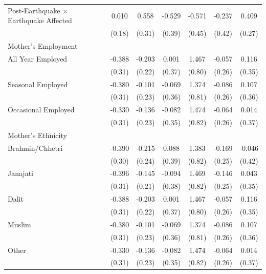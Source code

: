 \begin{longtable}{l*{6}{c}}
Post-Earthquake × Earthquake Affected & 0.010 & 0.558\sym{*} & -0.529 & -0.571 & -0.237 & 0.409 \\
                    & (0.18) & (0.31) & (0.39) & (0.45) & (0.42) & (0.27) \\
\multicolumn{7}{l}{Mother's Employment} \\
\hspace{1em}All Year Employed & -0.388 & -0.203 & 0.001 & 1.467\sym{*} & -0.057 & 0.116 \\
                    & (0.31) & (0.22) & (0.37) & (0.80) & (0.26) & (0.35) \\
\hspace{1em}Seasonal Employed & -0.380 & -0.101 & -0.069 & 1.374\sym{*} & -0.086 & 0.107 \\
                    & (0.31) & (0.23) & (0.36) & (0.81) & (0.26) & (0.36) \\
\hspace{1em}Occasional Employed & -0.330 & -0.136 & -0.082 & 1.474\sym{*} & -0.064 & 0.014 \\
                    & (0.31) & (0.23) & (0.35) & (0.82) & (0.26) & (0.37) \\
\multicolumn{7}{l}{Mother's Ethnicity} \\
\hspace{1em}Brahmin/Chhetri & -0.390 & -0.215 & 0.088 & 1.383\sym{*} & -0.169 & -0.046 \\
                    & (0.30) & (0.24) & (0.39) & (0.82) & (0.25) & (0.42) \\
\hspace{1em}Janajati & -0.396 & -0.145 & -0.094 & 1.469\sym{*} & -0.146 & 0.043 \\
                    & (0.31) & (0.21) & (0.38) & (0.82) & (0.25) & (0.35) \\
\hspace{1em}Dalit & -0.388 & -0.203 & 0.001 & 1.467\sym{*} & -0.057 & 0.116 \\
                    & (0.31) & (0.22) & (0.37) & (0.80) & (0.26) & (0.35) \\
\hspace{1em}Muslim & -0.380 & -0.101 & -0.069 & 1.374\sym{*} & -0.086 & 0.107 \\
                    & (0.31) & (0.23) & (0.36) & (0.81) & (0.26) & (0.36) \\
\hspace{1em}Other & -0.330 & -0.136 & -0.082 & 1.474\sym{*} & -0.064 & 0.014 \\
                    & (0.31) & (0.23) & (0.35) & (0.82) & (0.26) & (0.37) \\

\end{longtable}
